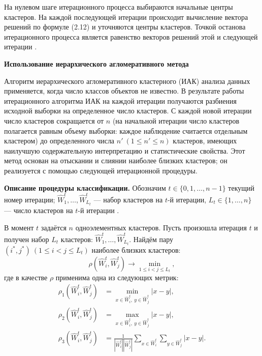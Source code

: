 \documentclass[14pt,a4paper]{extarticle}
\begin{document}
На нулевом шаге итерационного процесса выбираются начальные центры кластеров. На каждой последующей итерации происходит вычисление вектора решений по формуле (2.12) и уточняются центры кластеров. Точкой останова итерационного процесса является равенство векторов решений этой и следующей итерации \cite{kharin2008}.

\textbf{Использование иерархического агломеративного метода}

Алгоритм иерархического агломеративного кластерного (ИАК) анализа данных применяется, 
когда число классов объектов не известно. В результате работы итерационного алгоритма 
ИАК на каждой итерации получаются разбиения исходной выборки на определенное число 
кластеров. С каждой новой итерации число кластеров сокращается от $n$ (на начальной 
итерации число кластеров полагается равным объему выборки: каждое наблюдение считается 
отдельным кластером) до определенного числа $n'\ (1 \leq n' \leq n)$ кластеров, имеющих 
наилучшую содержательную интерпретацию и статистические свойства. Этот метод основан на 
отыскании и слиянии наиболее близких кластеров; он реализуется с помощью следующей 
итерационной процедуры.

\textbf{Описание процедуры классификации.} Обозначим $t \in \{0,1,\ldots,n-1\}$ текущий 
номер итерации; $\hat{W}_{1}^{t},\ldots,\hat{W}_{L_{t}}^{t}$ --- набор кластеров на 
$t$-й итерации, $L_{t} \in \{1,\ldots,n\}$ --- число кластеров на $t$-й итерации \cite{kharin2008}.

В момент $t$ задаётся $n$ одноэлементных кластеров. Пусть произошла итерация $t$ и 
получен набор $L_{t}$ кластеров: $\hat{W}_{1}^{t},\ldots,\hat{W}_{L_{t}}^{t}$. Найдём 
пару $(i^{*},j^{*})\ (1 \leq i < j \leq L_{t})$ наиболее близких кластеров:
\begin{equation}
\rho\left( \hat{W}_{i}^{t},\hat{W}_{j}^{t} \right) \rightarrow \min_{1 \leq i < j \leq L_{t}},
\end{equation}
где в качестве $\rho$ применима одна из следующих метрик:
\begin{align}
\rho_{1}\left( \hat{W}_{i}^{t},\hat{W}_{j}^{t} \right) &= \min_{x \in \hat{W}_{i}^{t},\ y \in \hat{W}_{j}^{t}} |x - y|,\\
\rho_{2}\left( \hat{W}_{i}^{t},\hat{W}_{j}^{t} \right) &= \max_{x \in \hat{W}_{i}^{t},\ y \in \hat{W}_{j}^{t}} |x - y|,\\
\rho_{3}\left( \hat{W}_{i}^{t},\hat{W}_{j}^{t} \right) &= \frac{1}{|\hat{W}_{i}^{t}| |\hat{W}_{j}^{t}|} \sum_{x \in \hat{W}_{i}^{t}} \sum_{y \in \hat{W}_{j}^{t}} |x - y|.
\end{align}
\end{document}

